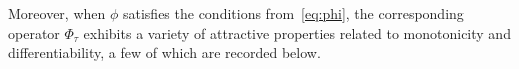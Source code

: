 \documentclass[10pt]{article}
\numberwithin{equation}{section}
\newcommand{\+}{%
	\raisebox{0.18ex}{\scaleobj{0.55}{+}}
}
\theoremstyle{definition}
\theoremstyle{definition}
\newcommand\numberthis{\addtocounter{equation}{1}\tag{\theequation}}
\begin{document}
\noindent 
Moreover, when $\phi$ satisfies the conditions from~\eqref{eq:phi}, the corresponding operator $\Phi_\tau$ exhibits a variety of attractive properties related to monotonicity and differentiability, a few of which are recorded below.
\noindent
\end{document}
